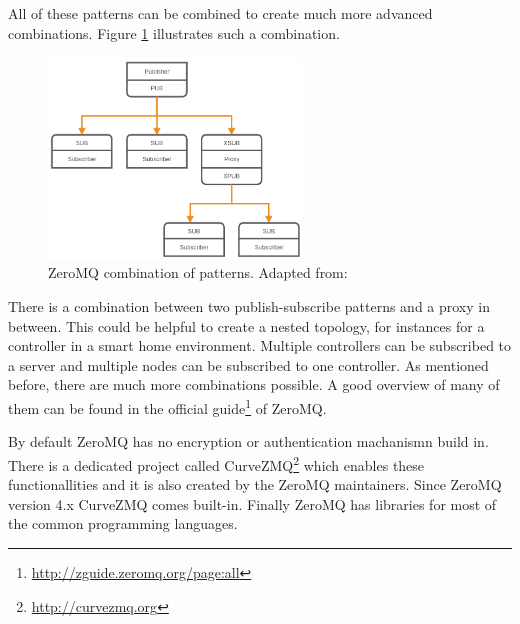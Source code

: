 All of these patterns can be combined to create much more advanced combinations.
Figure \ref{fig:zeromq_comination} illustrates such a combination.
\begin{figure}[H]
    \centering
    \includegraphics[width=0.6\textwidth]{resources/images/zeromq-complex.png}
    \caption[ZeroMQ combination of patterns]{ZeroMQ combination of patterns. Adapted from: \autocite{ZeroMQ:Guide}}
    \label{fig:zeromq_comination}
\end{figure}
There is a combination between two publish-subscribe patterns and a proxy in between.
This could be helpful to create a nested topology, for instances for a controller in a smart home environment.
Multiple controllers can be subscribed to a server and multiple nodes can be subscribed to one controller.
As mentioned before, there are much more combinations possible.
A good overview of many of them can be found in the official guide\footnote{\url{http://zguide.zeromq.org/page:all}} of ZeroMQ.

By default ZeroMQ has no encryption or authentication machanismn build in.
There is a dedicated project called CurveZMQ\footnote{\url{http://curvezmq.org}} which enables these functionallities and it is also created by the ZeroMQ maintainers.
Since ZeroMQ version 4.x CurveZMQ comes built-in.
Finally ZeroMQ has libraries for most of the common programming languages.
